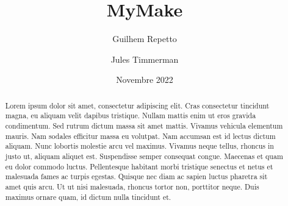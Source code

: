\documentclass[11pt]{article}
\title{MyMake}
\date{Novembre 2022}
\author{Guilhem Repetto \and Jules Timmerman}
\begin{document}
\maketitle

\begin{abstract}
 Lorem ipsum dolor sit amet, consectetur adipiscing elit. Cras consectetur tincidunt magna, eu aliquam velit dapibus tristique. Nullam mattis enim ut eros gravida condimentum. Sed rutrum dictum massa sit amet mattis. Vivamus vehicula elementum mauris. Nam sodales efficitur massa eu volutpat. Nam accumsan est id lectus dictum aliquam. Nunc lobortis molestie arcu vel maximus. Vivamus neque tellus, rhoncus in justo ut, aliquam aliquet est. Suspendisse semper consequat congue. Maecenas et quam eu dolor commodo luctus. Pellentesque habitant morbi tristique senectus et netus et malesuada fames ac turpis egestas. Quisque nec diam ac sapien luctus pharetra sit amet quis arcu. Ut ut nisi malesuada, rhoncus tortor non, porttitor neque. Duis maximus ornare quam, id dictum nulla tincidunt et.
\end{abstract}
\end{document}
